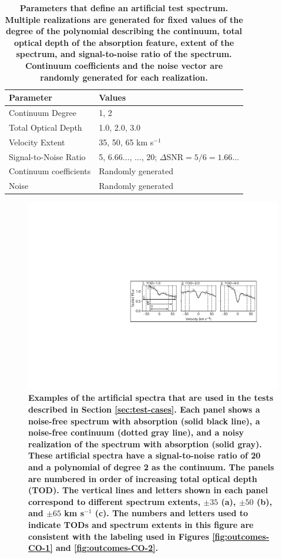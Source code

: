 \documentclass[trackchanges]{aastex62}
\begin{document}
\begin{table}
  \centering
\begin{tabular}{ll}
  {\bf Parameter} & {\bf Values} \\
  \hline
  Continuum Degree & 1, 2 \\
  Total Optical Depth & 1.0, 2.0, 3.0 \\
  Velocity Extent & 35, 50, 65 km s$^{-1}$ \\
  Signal-to-Noise Ratio & 5, 6.66$\ldots$, $\ldots$, 20; $\Delta$SNR$=5/6=1.66\ldots$\\
  Continuum coefficients & Randomly generated \\
  Noise & Randomly generated
\end{tabular}
\caption{
{
\bf
Parameters that define an artificial test spectrum.
Multiple realizations are generated for fixed values of the degree of the polynomial describing the continuum, total optical depth of the absorption feature, extent of the spectrum, and signal-to-noise ratio of the spectrum.
Continuum coefficients and the noise vector are randomly generated for each realization.
}
}
\label{tab:artificial-data:params}
\end{table}


\begin{figure}
  \includegraphics[width=\linewidth]{figures/annotated_example_data.pdf}
  \caption{
  \bf
  Examples of the artificial spectra that are used in the tests described in Section \ref{sec:test-cases}.
  Each panel shows a noise-free spectrum with absorption (solid black line), a noise-free continuum (dotted gray line), and a noisy realization of the spectrum with absorption (solid gray).
  These artificial spectra have a signal-to-noise ratio of 20 and a polynomial of degree 2 as the continuum.
  The panels are numbered in order of increasing total optical depth (TOD).
  The vertical lines and letters shown in each panel correspond to different spectrum extents, $\pm 35$ (a), $\pm 50$ (b), and $\pm 65$ km s$^{-1}$ (c).
  The numbers and letters used to indicate TODs and spectrum extents in this figure are consistent with the labeling used in Figures \ref{fig:outcomes-CO-1} and \ref{fig:outcomes-CO-2}.
  }
  \label{fig:artificial-data-eg}
\end{figure}
\end{document}
